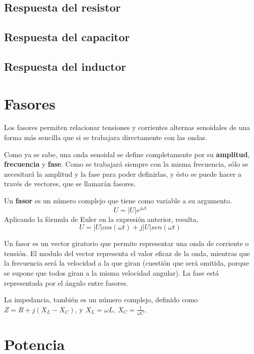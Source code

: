 \subsection{Respuesta del resistor}
\subsection{Respuesta del capacitor}
\subsection{Respuesta del inductor}
\section{Fasores}
Los fasores permiten relacionar tensiones y corrientes alternas senoidales de una forma más sencilla que si se trabajara directamente con las ondas.

Como ya se sabe, una onda senoidal se define completamente por su \textbf{amplitud}, \textbf{frecuencia} y \textbf{fase}. Como se trabajará siempre con la misma frecuencia, sólo se necesitará la amplitud y la fase para poder definirlas, y ésto se puede hacer a través de vectores, que se llamarán fasores.

Un \textbf{fasor} es un número complejo que tiene como variable a su argumento.
$$ U = | U | e^{j\omega t} $$
Aplicando la fórmula de Euler en la expresión anterior, resulta,
$$ U = | U | cos (\omega t) + j|U| sen(\omega t) $$

Un fasor es un vector giratorio que permite representar una onda de corriente o tensión. El modulo del vector representa el valor eficaz de la onda, mientras que la frecuencia será la velocidad a la que giran (cuestión que será omitida, porque se supone que todos giran a la misma velocidad angular). La fase está representada por el ángulo entre fasores.

La impedancia, también es un número complejo, definido como $Z= R+j(X_L - X_C)$, y $X_L = \omega L $, $X_C = \frac{1}{\omega C}$.
\section{Potencia}
